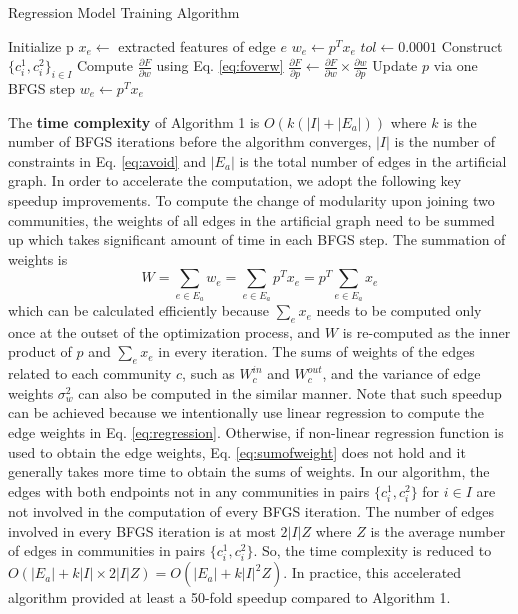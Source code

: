 \begin{algorithm}[ht!]
\caption{Regression Model Training Algorithm}
\begin{algorithmic}[ht!] \label{algo:1}
\State Initialize p
\State $x_e \leftarrow$ extracted features of edge $e$
\State $w_e \leftarrow p^T x_e$
\EndFor
\State $tol \leftarrow 0.0001$
\State Construct $\{c_i^1,c_i^2\}_{i\in I}$
\Repeat
\State Compute $\frac{ \partial F}{\partial w}$ using Eq. \ref{eq:foverw}
\State $ \frac{ \partial F}{\partial p} \leftarrow \frac{ \partial F}{\partial w} \times \frac{ \partial w}{\partial p} $
\State Update $p$ via one BFGS step
\State $w_e \leftarrow p^T x_e$
\EndFor
{}
\end{algorithmic}
\end{algorithm}

The \textbf{time complexity} of Algorithm 1 is $O(k(|I|+|E_a|))$ where $k$ is the number of BFGS iterations before the algorithm converges, $|I|$ is the number of constraints in Eq. \ref{eq:avoid} and $|E_a|$ is the total number of edges in the artificial graph. In order to accelerate the computation, we adopt the following key speedup improvements.
To compute the change of modularity upon joining two communities, the weights of all edges in the artificial graph need to be summed up which takes significant amount of time in each BFGS step. The summation of weights is
\begin{equation} \label{eq:sumofweight}
    W = \sum_{e\in E_a} {w_e} = \sum_{e\in E_a} p^T x_e = p^T \sum_{e\in E_a} {x_e}
\end{equation}
which can be calculated efficiently because $\sum_e {x_e}$ needs to be computed only once at the outset of the optimization process, and $W$ is re-computed as the inner product of $p$  and $\sum_e {x_e}$ in every iteration. The sums of weights of the edges related to each community $c$, such as $W^{in}_c$ and $W^{out}_c$, and the variance of edge weights $\sigma_w^2$ can also be computed in the similar manner. Note that such speedup can be achieved because we intentionally use linear regression to compute the edge weights in Eq. \ref{eq:regression}. Otherwise, if non-linear regression function is used to obtain the edge weights, Eq. \ref{eq:sumofweight} does not hold and it generally takes more time to
obtain the sums of weights.
In our algorithm, the edges with both endpoints not in any communities in pairs $\{c_i^1, c_i^2\}$ for $i\in I$ are not involved in the computation of every BFGS iteration. The number of edges involved in every BFGS iteration is at most $2|I|Z$ where $Z$ is the average number of edges in communities in pairs $\{c_i^1, c_i^2\}$. So, the time complexity is reduced to $O(|E_a| + k|I| \times 2|I|Z) = O(|E_a| + k|I|^2Z)$. In practice, this accelerated algorithm provided at least a 50-fold speedup compared to Algorithm 1. 

